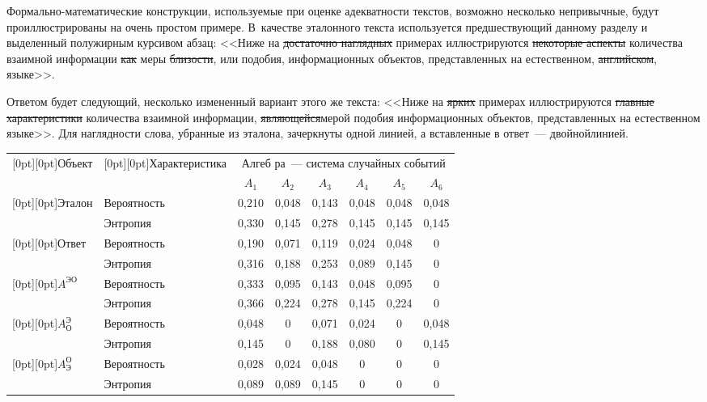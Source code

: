 \begin{multicols}{2}
      Формально-математические конструкции, используемые при оценке 
адекватности текстов, возможно несколько непривычные, будут 
проиллюстрированы на очень простом примере. В~качестве эталонного текста 
используется предшествующий данному разделу и выделенный полужирным 
курсивом абзац: <<Ниже на \sout{достаточно наглядных} примерах иллюстрируются 
\sout{некоторые аспекты} количества взаимной информации \sout{как} меры 
\sout{близости}, или подобия, информационных объектов, пред\-став\-лен\-ных на 
естественном, \sout{английском}, языке>>.
      
      Ответом будет следующий, несколько измененный вариант этого же текста: 
<<Ниже на \sout{\sout{ярких}} примерах иллюстрируются \sout{\sout{главные характеристики}} количества 
взаимной информации, \sout{\sout{являющейся}}\linebreak мерой подобия информационных объектов, 
представленных на естественном языке>>. Для на\-гляд\-ности слова, убранные из 
эталона, зачеркнуты одной линией, а вставленные в ответ~--- двойной\linebreak линией. 

      \begin{table*}\small %
      \begin{center}
       \vspace*{2ex}
       
       \tabcolsep=7pt
       \begin{tabular}{|l|l|c|c|c|c|c|c|}
       \hline  %
\multicolumn{1}{|c|}{\raisebox{-6pt}[0pt][0pt]{Объект}}&
\multicolumn{1}{c|}{\raisebox{-6pt}[0pt][0pt]{Характеристика}}&\multicolumn{6}{c|}{Алгеб
ра~--- система случайных событий}\\
\cline{3-8}
&&$A_1$&$A_2$&$A_3$&$A_4$&$A_5$&$A_6$\\
\hline
\raisebox{-6pt}[0pt][0pt]{Эталон}&Вероятность&0,210&0,048&0,143&0,048&0,048&0,048\\
&Энтропия&0,330&0,145&0,278&0,145&0,145&0,145\\
\hline
\raisebox{-6pt}[0pt][0pt]{Ответ}&Вероятность &0,190&0,071&0,119&0,024&0,048&0\\
&Энтропия&0,316&0,188&0,253&0,089&0,145&0\\
\hline
\raisebox{-6pt}[0pt][0pt]{$A^{\mathrm{ЭО}}$}&Вероятность&0,333&0,095&0,143&0,048&0,095&0\\
&Энтропия&0,366&0,224&0,278&0,145&0,224&0\\
\hline
\raisebox{-6pt}[0pt][0pt]{$A_{\mathrm{О}}^{\mathrm{Э}}$}&Вероятность&0,048&0&0,071&0,024&0&0,048\\
&Энтропия&0,145&0&0,188&0,080&0&0,145\\
\hline
\raisebox{-6pt}[0pt][0pt]{$A^{\mathrm{О}}_{\mathrm{Э}}$}&Вероятность&0,028&0,024&0,048&0&0&0\\
&Энтропия&0,089&0,089&0,145&0&0&0\\
\hline
\end{tabular}
\end{center}
\end{table*}
      

\end{multicols}
